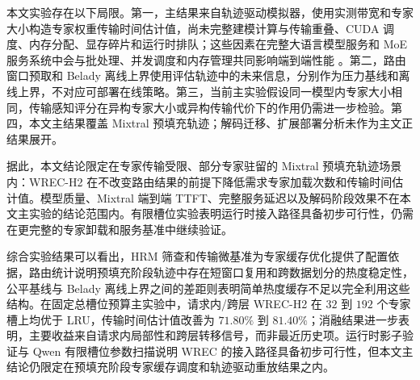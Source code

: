 本文实验存在以下局限。第一，主结果来自轨迹驱动模拟器，使用实测带宽和专家大小构造专家权重传输时间估计值，尚未完整建模计算与传输重叠、CUDA 调度、内存分配、显存碎片和运行时排队；这些因素在完整大语言模型服务和 MoE 服务系统中会与批处理、并发调度和内存管理共同影响端到端性能 \cite{yu2022orca,kwon2023pagedattention,zheng2024sglang,cao2025moelightning}。第二，路由窗口预取和 Belady 离线上界使用评估轨迹中的未来信息，分别作为压力基线和离线上界，不对应可部署在线策略。第三，当前主实验假设同一模型内专家大小相同，传输感知评分在异构专家大小或异构传输代价下的作用仍需进一步检验。第四，本文主结果覆盖 Mixtral 预填充轨迹；解码迁移、扩展部署分析未作为主文正结果展开。

据此，本文结论限定在专家传输受限、部分专家驻留的 Mixtral 预填充轨迹场景内：WREC-H2 在不改变路由结果的前提下降低需求专家加载次数和传输时间估计值。模型质量、Mixtral 端到端 TTFT、完整服务延迟以及解码阶段效果不在本文主实验的结论范围内。有限槽位实验表明运行时接入路径具备初步可行性，仍需在更完整的专家卸载和服务基准中继续验证。

综合实验结果可以看出，HRM 筛查和传输微基准为专家缓存优化提供了配置依据，路由统计说明预填充阶段轨迹中存在短窗口复用和跨数据划分的热度稳定性，公平基线与 Belady 离线上界之间的差距则表明简单热度缓存不足以完全利用这些结构。在固定总槽位预算主实验中，请求内/跨层 WREC-H2 在 $32$ 到 $192$ 个专家槽上均优于 LRU，传输时间估计值改善为 $71.80\%$ 到 $81.40\%$；消融结果进一步表明，主要收益来自请求内局部性和跨层转移信号，而非最近历史项。运行时影子验证与 Qwen 有限槽位参数扫描说明 WREC 的接入路径具备初步可行性，但本文主结论仍限定在预填充阶段专家缓存调度和轨迹驱动重放结果之内。
